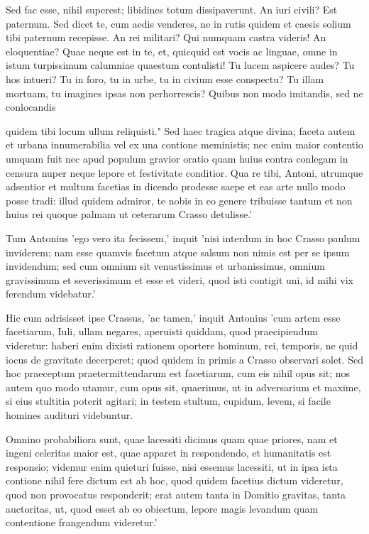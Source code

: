  Sed fac esse, nihil superest; libidines totum dissipaverunt. An iuri civili? Est paternum. Sed dicet te, cum aedis venderes, ne in rutis quidem et caesis solium tibi paternum recepisse. An rei militari? Qui numquam castra videris! An eloquentiae? Quae neque est in te, et, quicquid est vocis ac linguae, omne in istum turpissimum calumniae quaestum contulisti! Tu lucem aspicere audes? Tu hos intueri? Tu in foro, tu in urbe, tu in civium esse conspectu? Tu illam mortuam, tu imagines ipsas non perhorrescis? Quibus non modo imitandis, sed ne conlocandis

 quidem tibi locum ullum reliquisti." Sed haec tragica atque divina; faceta autem et urbana innumerabilia vel ex una contione meministis; nec enim maior contentio umquam fuit nec apud populum gravior oratio quam huius contra conlegam in censura nuper neque lepore et festivitate conditior. Qua re tibi, Antoni, utrumque adsentior et multum facetias in dicendo prodesse saepe et eas arte nullo modo posse tradi: illud quidem admiror, te nobis in eo genere tribuisse tantum et non huius rei quoque palmam ut ceterarum Crasso detulisse.'

 Tum Antonius 'ego vero ita fecissem,' inquit 'nisi interdum in hoc Crasso paulum inviderem; nam esse quamvis facetum atque salsum non nimis est per se ipsum invidendum; sed cum omnium sit venustissimus et urbanissimus, omnium gravissimum et severissimum et esse et videri, quod isti contigit uni, id mihi vix ferendum videbatur.'

 Hic cum adrisisset ipse Crassus, 'ac tamen,' inquit Antonius 'cum artem esse facetiarum, Iuli, ullam negares, aperuisti quiddam, quod praecipiendum videretur: haberi enim dixisti rationem oportere hominum, rei, temporis, ne quid iocus de gravitate decerperet; quod quidem in primis a Crasso observari solet. Sed hoc praeceptum praetermittendarum est facetiarum, cum eis nihil opus sit; nos autem quo modo utamur, cum opus sit, quaerimus, ut in adversarium et maxime, si eius stultitia poterit agitari; in testem stultum, cupidum, levem, si facile homines audituri videbuntur.

 Omnino probabiliora sunt, quae lacessiti dicimus quam quae priores, nam et ingeni celeritas maior est, quae apparet in respondendo, et humanitatis est responsio; videmur enim quieturi fuisse, nisi essemus lacessiti, ut in ipsa ista contione nihil fere dictum est ab hoc, quod quidem facetius dictum videretur, quod non provocatus responderit; erat autem tanta in Domitio gravitas, tanta auctoritas, ut, quod esset ab eo obiectum, lepore magis levandum quam contentione frangendum videretur.'

